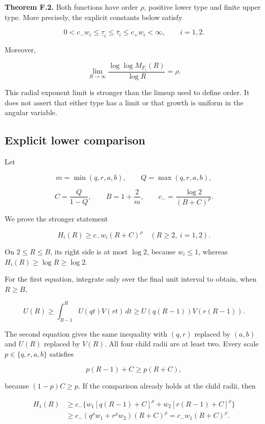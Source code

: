 \textbf{Theorem F.2.} Both functions have order \(\rho\), positive lower
type and finite upper type. More precisely, the explicit constants below
satisfy

\[
0<c_-w_i\le\underline\tau_i\le\overline\tau_i\le c_+w_i<\infty,
\qquad i=1,2.
\]

Moreover,

\[
\lim_{R\to\infty}\frac{\log\log M_{F_i}(R)}{\log R}=\rho.
\]

This radial exponent limit is stronger than the limsup used to define
order. It does not assert that either type has a limit or that growth is
uniform in the angular variable.

\hypertarget{v11-coupled_growth_full-explicit-lower-comparison}{%
\subsection{Explicit lower
comparison}\label{v11-coupled_growth_full-explicit-lower-comparison}}

Let

\[
m=\min(q,r,a,b),\qquad Q=\max(q,r,a,b),
\]

\[
C=\frac{Q}{1-Q},\qquad B=1+\frac2m,
\qquad c_-=\frac{\log2}{(B+C)^\rho}.
\]

We prove the stronger statement

\[
\boxed{H_i(R)\ge c_-w_i(R+C)^\rho\quad(R\ge2,\ i=1,2).}
\]

On \(2\le R\le B\), its right side is at most \(\log2\), because
\(w_i\le1\), whereas \(H_i(R)\ge\log R\ge\log2\).

For the first equation, integrate only over the final unit interval to
obtain, when \(R\ge B\),

\[
U(R)\ge\int_{R-1}^R U(qt)V(rt)\,dt
\ge U(q(R-1))V(r(R-1)).
\]

The second equation gives the same inequality with \((q,r)\) replaced by
\((a,b)\) and \(U(R)\) replaced by \(V(R)\). All four child radii are at
least two. Every scale \(p\in\{q,r,a,b\}\) satisfies

\[
p(R-1)+C\ge p(R+C),
\]

because \((1-p)C\ge p\). If the comparison already holds at the child
radii, then

\[
\begin{aligned}
H_1(R)&\ge c_-\{w_1[q(R-1)+C]^\rho
                     +w_2[r(R-1)+C]^\rho\}\\
&\ge c_-(q^\rho w_1+r^\rho w_2)(R+C)^\rho
=c_-w_1(R+C)^\rho.
\end{aligned}
\]

